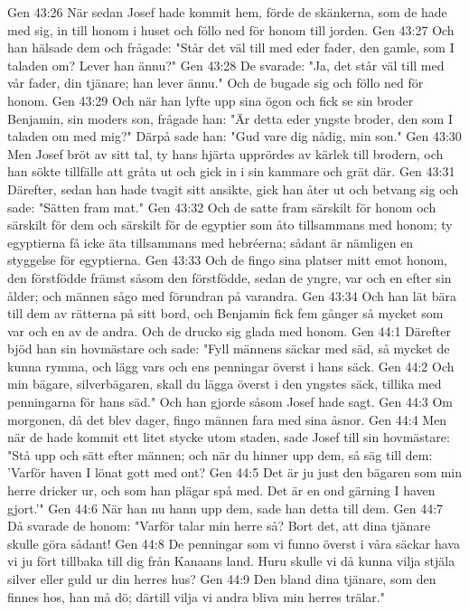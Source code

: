 Gen 43:26  När sedan Josef hade kommit hem, förde de skänkerna, som de hade med sig, in till honom i huset och föllo ned för honom till jorden.
Gen 43:27  Och han hälsade dem och frågade: "Står det väl till med eder fader, den gamle, som I taladen om? Lever han ännu?"
Gen 43:28  De svarade: "Ja, det står väl till med vår fader, din tjänare; han lever ännu." Och de bugade sig och föllo ned för honom.
Gen 43:29  Och när han lyfte upp sina ögon och fick se sin broder Benjamin, sin moders son, frågade han: "Är detta eder yngste broder, den som I taladen om med mig?" Därpå sade han: "Gud vare dig nådig, min son."
Gen 43:30  Men Josef bröt av sitt tal, ty hans hjärta upprördes av kärlek till brodern, och han sökte tillfälle att gråta ut och gick in i sin kammare och grät där.
Gen 43:31  Därefter, sedan han hade tvagit sitt ansikte, gick han åter ut och betvang sig och sade: "Sätten fram mat."
Gen 43:32  Och de satte fram särskilt för honom och särskilt för dem och särskilt för de egyptier som åto tillsammans med honom; ty egyptierna få icke äta tillsammans med hebréerna; sådant är nämligen en styggelse för egyptierna.
Gen 43:33  Och de fingo sina platser mitt emot honom, den förstfödde främst såsom den förstfödde, sedan de yngre, var och en efter sin ålder; och männen sågo med förundran på varandra.
Gen 43:34  Och han lät bära till dem av rätterna på sitt bord, och Benjamin fick fem gånger så mycket som var och en av de andra. Och de drucko sig glada med honom.
Gen 44:1  Därefter bjöd han sin hovmästare och sade: "Fyll männens säckar med säd, så mycket de kunna rymma, och lägg vars och ens penningar överst i hans säck.
Gen 44:2  Och min bägare, silverbägaren, skall du lägga överst i den yngstes säck, tillika med penningarna för hans säd." Och han gjorde såsom Josef hade sagt.
Gen 44:3  Om morgonen, då det blev dager, fingo männen fara med sina åsnor.
Gen 44:4  Men när de hade kommit ett litet stycke utom staden, sade Josef till sin hovmästare: "Stå upp och sätt efter männen; och när du hinner upp dem, så säg till dem: 'Varför haven I lönat gott med ont?
Gen 44:5  Det är ju just den bägaren som min herre dricker ur, och som han plägar spå med. Det är en ond gärning I haven gjort.'"
Gen 44:6  När han nu hann upp dem, sade han detta till dem.
Gen 44:7  Då svarade de honom: "Varför talar min herre så? Bort det, att dina tjänare skulle göra sådant!
Gen 44:8  De penningar som vi funno överst i våra säckar hava vi ju fört tillbaka till dig från Kanaans land. Huru skulle vi då kunna vilja stjäla silver eller guld ur din herres hus?
Gen 44:9  Den bland dina tjänare, som den finnes hos, han må dö; därtill vilja vi andra bliva min herres trälar."
